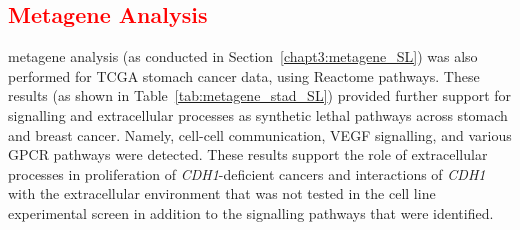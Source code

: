 \FloatBarrier

\subsection{\textcolor{red}{Metagene Analysis}} \label{chapt3:metagene_stad_SL}

\Gls{metagene} analysis (as conducted in Section~\ref{chapt3:metagene_SL}) was also performed for \gls{TCGA} stomach cancer  data, using Reactome \glspl{pathway}. These results (as shown in Table~\ref{tab:metagene_stad_SL}) provided further support for signalling and extracellular processes as \gls{synthetic lethal} \glspl{pathway} across stomach and breast cancer. Namely, cell-cell communication, VEGF signalling, and various \gls{GPCR} \glspl{pathway} were detected.  
%
These results support the role of extracellular processes in proliferation of \textit{CDH1}-deficient cancers and interactions of \textit{CDH1} with the extracellular environment that was not tested in the cell line experimental screen in addition to the signalling pathways that were identified.

